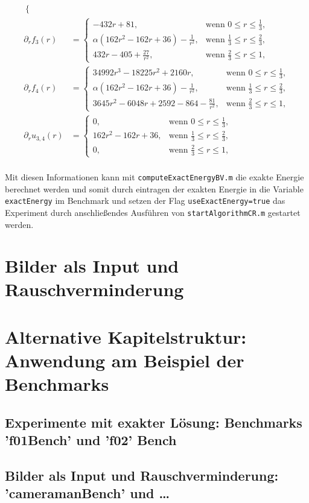 \begin{align*}
\begin{cases}
  \end{cases}\\
  \partial_r f_3(r) &=
  \begin{cases}
    - 432r + 81, & \text{wenn } 0\leq r\leq\frac{1}{3},\\
    \alpha\left(162r^2 - 162r + 36\right) - \frac{1}{r^2}, & 
    \text{wenn } \frac{1}{3}\leq r\leq \frac{2}{3},\\
    432r - 405 + \frac{27}{r^2}, & 
    \text{wenn } \frac{2}{3}\leq r\leq 1,
  \end{cases}\\
  \partial_r f_4(r) &=
  \begin{cases}
    34992r^3 - 18225r^2 + 2160r, & \text{wenn } 0\leq r\leq\frac{1}{3},\\
    \alpha\left(162r^2 - 162r + 36\right) - \frac{1}{r^2}, & 
    \text{wenn } \frac{1}{3}\leq r\leq \frac{2}{3},\\
    3645r^2 - 6048r + 2592 - 864 - \frac{81}{r^2}, & 
    \text{wenn } \frac{2}{3}\leq r\leq 1,
  \end{cases}\\
  \partial_r u_{3,4}(r) &=
  \begin{cases}
    0, & \text{wenn } 0\leq r\leq\frac{1}{3},\\
    162r^2 - 162r + 36, & 
    \text{wenn } \frac{1}{3}\leq r\leq \frac{2}{3},\\
    0, & \text{wenn } \frac{2}{3}\leq r\leq 1,
  \end{cases}\\
\end{align*}

Mit diesen Informationen kann mit \texttt{computeExactEnergyBV.m} die exakte 
Energie berechnet werden und somit durch eintragen der exakten Energie
in die Variable \texttt{exactEnergy} im Benchmark und setzen der Flag
\texttt{useExactEnergy=true} das Experiment durch anschließendes Ausführen
von \texttt{startAlgorithmCR.m} gestartet werden.

\section{Bilder als Input und Rauschverminderung}


\section{Alternative Kapitelstruktur: Anwendung am Beispiel der Benchmarks}
\subsection{Experimente mit exakter Lösung: Benchmarks 'f01Bench' und 'f02'
Bench}

\subsection{Bilder als Input und Rauschverminderung: 'cameramanBench' und
\ldots}
